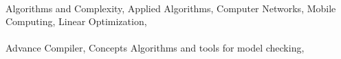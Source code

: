  \hfill \\[-0.1cm]
\hspace*{0.45cm} Algorithms and Complexity, Applied Algorithms, Computer Networks, Mobile Computing, Linear Optimization, \\ \\[-0.3cm]
\hspace*{0.45cm} Advance Compiler, Concepts Algorithms and tools for model checking, \\[-0.2cm]

